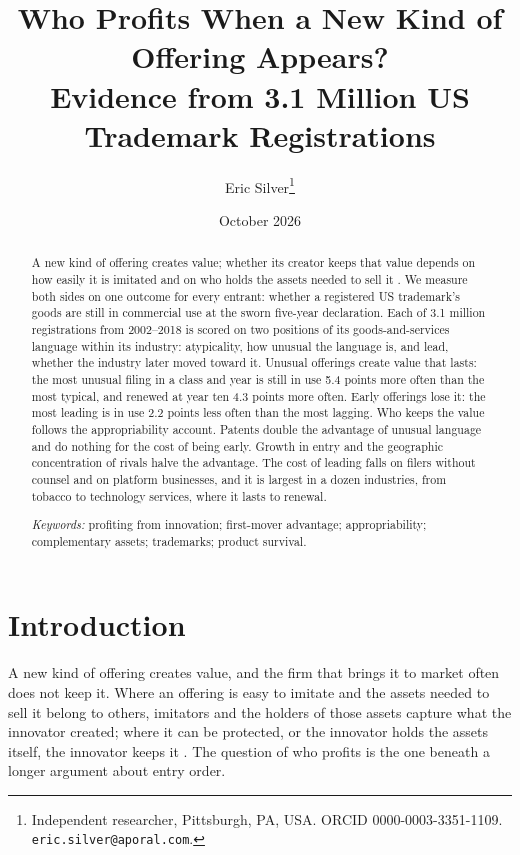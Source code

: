 \title{\bfseries Who Profits When a New Kind of Offering Appears?\\
\large Evidence from 3.1 Million US Trademark Registrations}
\author{Eric Silver\thanks{Independent researcher, Pittsburgh, PA, USA.
ORCID 0000-0003-3351-1109. \texttt{eric.silver@aporal.com}.}}
\date{October 2026}


\maketitle
\begin{abstract}
\noindent A new kind of offering creates value; whether its creator keeps
that value depends on how easily it is imitated and on who holds the
assets needed to sell it \citep{Teece1986}. We measure both sides on one
outcome for every entrant: whether a registered US trademark's goods are
still in commercial use at the sworn five-year declaration. Each of 3.1
million registrations from 2002--2018 is scored on two positions of its
goods-and-services language within its industry: atypicality, how unusual
the language is, and lead, whether the industry later moved toward it.
Unusual offerings create value that lasts: the most unusual filing in a
class and year is still in use 5.4 points more often than the most
typical, and renewed at year ten 4.3 points more often. Early offerings
lose it: the most leading is in use 2.2 points less often than the most
lagging. Who keeps the value follows the appropriability account. Patents
double the advantage of unusual language and do nothing for the cost of
being early. Growth in entry and the geographic concentration of rivals
halve the advantage. The cost of leading falls on filers without counsel
and on platform businesses, and it is largest in a dozen industries, from
tobacco to technology services, where it lasts to renewal.

\medskip
\noindent\emph{Keywords:} profiting from innovation; first-mover
advantage; appropriability; complementary assets; trademarks; product
survival.
\end{abstract}

\section{Introduction}\label{sec:intro}

A new kind of offering creates value, and the firm that brings it to
market often does not keep it. Where an offering is easy to imitate and
the assets needed to sell it belong to others, imitators and the holders
of those assets capture what the innovator created; where it can be
protected, or the innovator holds the assets itself, the innovator keeps
it \citep{Teece1986}. The question of who profits is the one beneath a
longer argument about entry order.

